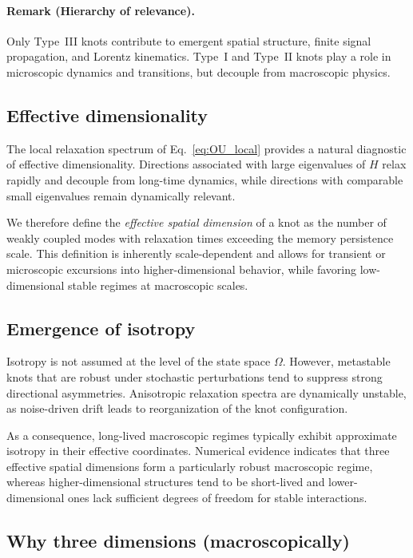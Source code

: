\documentclass[reprint,amsmath,amssymb,aps,prl,nofootinbib,floatfix]{revtex4-2}
\begin{document}
\paragraph{Remark (Hierarchy of relevance).}
Only Type~III knots contribute to emergent spatial structure, finite signal propagation, and Lorentz kinematics.
Type~I and Type~II knots play a role in microscopic dynamics and transitions, but decouple from macroscopic physics.

\subsection{Effective dimensionality}
The local relaxation spectrum of Eq.~\eqref{eq:OU_local} provides a natural diagnostic of effective dimensionality.
Directions associated with large eigenvalues of $H$ relax rapidly and decouple from long-time dynamics, while directions with comparable small eigenvalues remain dynamically relevant.

We therefore define the \emph{effective spatial dimension} of a knot as the number of weakly coupled modes with relaxation times exceeding the memory persistence scale.
This definition is inherently scale-dependent and allows for transient or microscopic excursions into higher-dimensional behavior, while favoring low-dimensional stable regimes at macroscopic scales.

\subsection{Emergence of isotropy}
Isotropy is not assumed at the level of the state space $\Omega$.
However, metastable knots that are robust under stochastic perturbations tend to suppress strong directional asymmetries. Anisotropic relaxation spectra are dynamically unstable, as noise-driven drift leads to reorganization of the knot configuration.

As a consequence, long-lived macroscopic regimes typically exhibit approximate isotropy in their effective coordinates.
Numerical evidence indicates that three effective spatial dimensions form a particularly robust macroscopic regime, whereas higher-dimensional structures tend to be short-lived and lower-dimensional ones lack sufficient degrees of freedom for stable interactions.


\subsection{Why three dimensions (macroscopically)}
\end{document}

